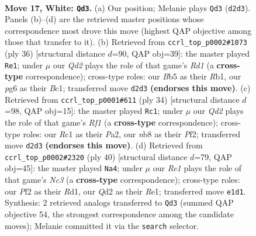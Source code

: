 \documentclass[11pt]{article}
\begin{document}
\clearpage

\begin{figure}[p]\centering
\begin{subfigure}{0.46\textwidth}\centering
\resizebox{\linewidth}{!}{%
\newchessgame
\chessboard[
  setfen={1nbq1r1k/5p2/1p2pnp1/1B1p3p/3P4/r1N2NP1/P1PQ1PP1/2R1RK2 w - - 2 17},
  showmover=false,
  pgfstyle=straightmove, color=movearrow, markmove={d2-d3}
]}
\caption{}
\end{subfigure}\hfill
\begin{subfigure}{0.46\textwidth}\centering
\resizebox{\linewidth}{!}{%
\newchessgame
\chessboard[
  setfen={2r3k1/pp1qp1bp/4nrp1/nP1p4/3P3P/2NQ1N2/P4PP1/1RBR2K1 w - - 0 19},
  showmover=false,
  pgfstyle=straightmove, color=movearrow, markmove={d1-e1}
]}
\caption{}
\end{subfigure}
\\[4pt]
\begin{subfigure}{0.46\textwidth}\centering
\resizebox{\linewidth}{!}{%
\newchessgame
\chessboard[
  setfen={r1b1k2r/ppq2p2/1np1p1pp/4P3/6RP/3B1N2/PP2QPP1/5RK1 w kq - 0 18},
  showmover=false,
  pgfstyle=straightmove, color=movearrow, markmove={f1-c1}
]}
\caption{}
\end{subfigure}\hfill
\begin{subfigure}{0.46\textwidth}\centering
\resizebox{\linewidth}{!}{%
\newchessgame
\chessboard[
  setfen={1kbr4/1p3pb1/pqnpp2p/8/4PPr1/PBN2N2/1PPQ3P/1K1RR3 w - - 1 21},
  showmover=false,
  pgfstyle=straightmove, color=movearrow, markmove={c3-a4}
]}
\caption{}
\end{subfigure}
\caption{\textbf{Move 17, White: \texttt{Qd3}.} (a) Our position; Melanie plays \texttt{Qd3} (\texttt{d2d3}). Panels (b)--(d) are the retrieved master positions whose correspondence most drove this move (highest QAP objective among those that transfer to it). (b) Retrieved from \texttt{ccrl\_top\_p0002\#1073} (ply 36) [structural distance $d$=90, QAP obj=39]: the master played \texttt{Re1}; under $\mu$ our \emph{Qd2} plays the role of that game's \emph{Rd1} (a \textbf{cross-type} correspondence); cross-type roles: our \emph{B}b5 as their \emph{R}b1, our \emph{p}g6 as their \emph{B}c1; transferred move \texttt{d2d3} \textbf{(endorses this move)}. (c) Retrieved from \texttt{ccrl\_top\_p0001\#611} (ply 34) [structural distance $d$=98, QAP obj=15]: the master played \texttt{Rc1}; under $\mu$ our \emph{Qd2} plays the role of that game's \emph{Rf1} (a \textbf{cross-type} correspondence); cross-type roles: our \emph{R}c1 as their \emph{P}a2, our \emph{n}b8 as their \emph{P}f2; transferred move \texttt{d2d3} \textbf{(endorses this move)}. (d) Retrieved from \texttt{ccrl\_top\_p0002\#2320} (ply 40) [structural distance $d$=79, QAP obj=45]: the master played \texttt{Na4}; under $\mu$ our \emph{Re1} plays the role of that game's \emph{Nc3} (a \textbf{cross-type} correspondence); cross-type roles: our \emph{P}f2 as their \emph{R}d1, our \emph{Q}d2 as their \emph{R}e1; transferred move \texttt{e1d1}. Synthesis: 2 retrieved analogs transferred to \texttt{Qd3} (summed QAP objective 54, the strongest correspondence among the candidate moves); Melanie committed it via the \texttt{search} selector.}
\label{fig:thought-m32}
\end{figure}
\end{document}
